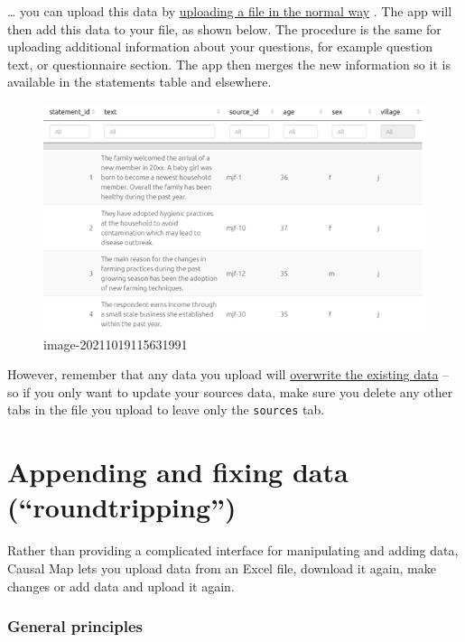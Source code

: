 \documentclass[
]{book}
\begin{document}
\ldots{} you can upload this data by \protect\hyperlink{upload-summary}{uploading a file in the normal way} . The app will then add this data to your file, as shown below. The procedure is the same for uploading additional information about your questions, for example question text, or questionnaire section. The app then merges the new information so it is available in the statements table and elsewhere.

\begin{figure}
\centering
\includegraphics[width=6.77083in,height=\textheight]{_assets/image-20211019115631991.png}
\caption{image-20211019115631991}
\end{figure}

However, remember that any data you upload will \protect\hyperlink{import-general-principles}{overwrite the existing data} -- so if you only want to update your sources data, make sure you delete any other tabs in the file you upload to leave only the \texttt{sources} tab.

\hypertarget{xroundtripping}{%
\chapter{Appending and fixing data (``roundtripping'')}\label{xroundtripping}}

Rather than providing a complicated interface for manipulating and adding data, Causal Map lets you upload data from an Excel file, download it again, make changes or add data and upload it again.

\hypertarget{import-general-principles}{%
\subsection{General principles}\label{import-general-principles}}
\end{document}
